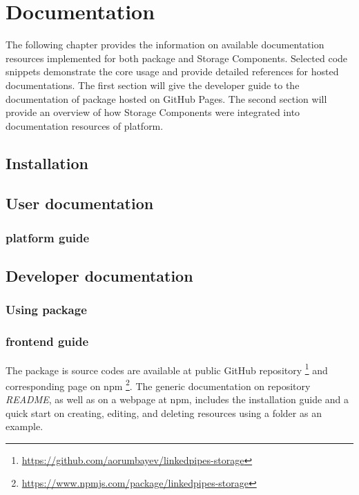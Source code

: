 \chapter{Documentation}
\label{chap:num_8}

The following chapter provides the information on available documentation resources implemented for both \lpas{} package and \lpa{} Storage Components. Selected code snippets demonstrate the core usage and provide detailed references for hosted documentations. The first section will give the developer guide to the documentation of \lpa{} package hosted on GitHub Pages. The second section will provide an overview of how \lpa{} Storage Components were integrated into documentation resources of \lpa{} platform.

\section{Installation}

\section{User documentation}

\subsection{\lpa{} platform guide}


\section{Developer documentation}

\subsection{Using \lpas{} package}

\subsection{\lpa{} frontend guide}

The package is source codes are available at public GitHub repository \footnote{\url{https://github.com/aorumbayev/linkedpipes-storage}} and corresponding page on npm \footnote{\url{https://www.npmjs.com/package/linkedpipes-storage}}. The generic documentation on repository \textit{README}, as well as on a webpage at npm, includes the installation guide and a quick start on creating, editing, and deleting resources using a folder as an example. 

